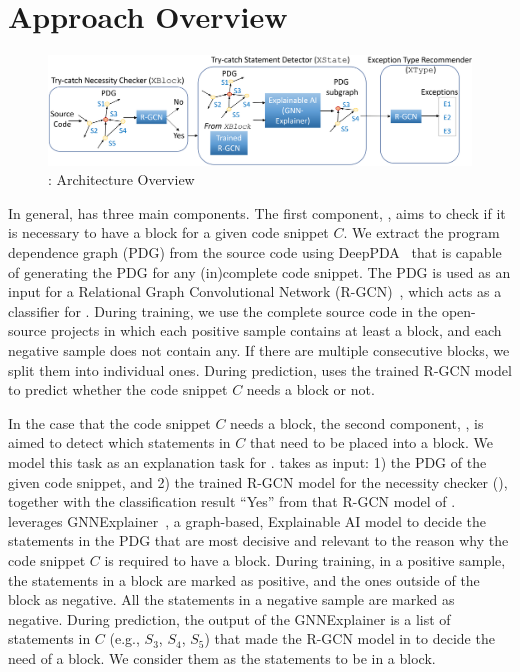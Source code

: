 \section{Approach Overview}
\label{sec:overview}

\begin{figure}[t]
\begin{center}
\includegraphics[width=5.4in]{overview-2.png}
\vspace{-10pt}
\caption{{\tool}: Architecture Overview}
\label{overview}
\end{center}
\end{figure}


In general, {\tool} has three main components. The first
component, {\xblock}, aims to check if it is necessary to have a
 block for a given code snippet $C$. We extract the
program dependence graph (PDG) from the source code using
DeepPDA~\cite{icse23} that is capable of generating the PDG for any
(in)complete code snippet. The PDG is used as an input for a
Relational Graph Convolutional Network (R-GCN)~\cite{rgcn}, which acts
as a classifier for {\xblock}. During training, we use the complete
source code in the open-source projects in which each positive sample
contains at least a  block, and each negative sample
does not contain any. If there are multiple consecutive blocks, we
split them into individual ones. During prediction, {\xblock} uses the
trained R-GCN model to predict whether the code snippet $C$ needs a
 block or not.

In the case that the code snippet $C$ needs a  block,
the second component, {\xstate}, is aimed to detect which statements
in $C$ that need to be placed into a  block.  We model
this task as an explanation task for {\xblock}. {\xstate} takes as
input: 1) the PDG of the given code snippet, and 2) the trained R-GCN
model for the  necessity checker ({\xblock}), together
with the classification result ``Yes'' from that R-GCN model of
{\xblock}. {\xstate} leverages GNNExplainer~\cite{GNNExplainer}, a
graph-based, Explainable AI model to decide the statements in the PDG
that are most decisive and relevant to the reason why the code snippet
$C$ is required to have a  block. During training, in
a positive sample, the statements in a  block are
marked as positive, and the ones outside of the block as negative. All
the statements in a negative sample are marked as negative. During
prediction, the output of the GNNExplainer is a list of statements in
$C$ (e.g., $S_3$, $S_4$, $S_5$) that made the R-GCN model in {\xblock}
to decide the need of a  block. We consider them as
the statements to be in a  block.

